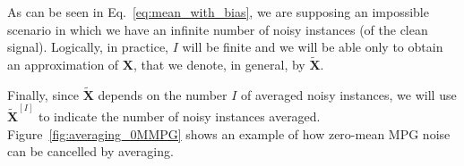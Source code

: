 \documentclass{article}
\begin{document}

As can be seen in Eq.~\ref{eq:mean_with_bias}, we are
supposing an impossible scenario in which we have an infinite number
of noisy instances (of the clean signal). Logically, in practice, $I$
will be finite and we will be able only to obtain an approximation of
${\mathbf X}$, that we denote, in general, by $\tilde{\mathbf
  X}$.

Finally, since $\tilde{\mathbf X}$ depends on the number $I$ of
averaged noisy instances, we will use $\tilde{\mathbf X}^{[I]}$ to
indicate the number of noisy instances averaged.
Figure~\ref{fig:averaging_0MMPG} shows an example of how zero-mean MPG
noise can be cancelled by averaging.
  
\end{document}
